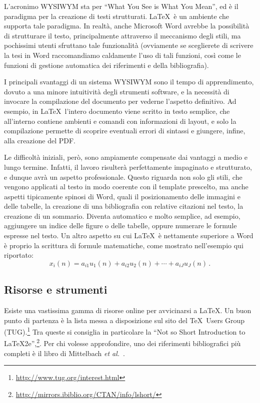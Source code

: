 \documentclass[12pt]{report}
\begin{document}
L'acronimo WYSIWYM sta per ``What You See is What You Mean'', ed è il paradigma per la creazione di testi strutturati. \LaTeX\ è un ambiente che supporta tale paradigma. In realtà, anche Microsoft Word avrebbe la possibilità di strutturare il testo, principalmente attraverso il meccanismo degli stili, ma pochissimi utenti sfruttano tale funzionalità (ovviamente se sceglierete di scrivere la tesi in Word raccomandiamo caldamente l'uso di tali funzioni, così come le funzioni di gestione automatica dei riferimenti e della bibliografia).

I principali svantaggi di un sistema WYSIWYM sono il tempo di apprendimento, dovuto a una minore intuitività degli strumenti software, e la necessità di invocare la compilazione del documento per vederne l'aspetto definitivo. Ad esempio, in \LaTeX\ l'intero documento viene scritto in testo semplice, che all'interno contiene ambienti e comandi con informazioni di layout, e solo la compilazione permette di scoprire eventuali errori di sintassi e giungere, infine, alla creazione del PDF. 

Le difficoltà iniziali, però, sono ampiamente compensate dai vantaggi a medio e lungo termine. Infatti, il lavoro risulterà perfettamente impaginato e strutturato, e dunque avrà un aspetto professionale. Questo riguarda non solo gli stili, che vengono applicati al testo in modo coerente con il template prescelto, ma anche aspetti tipicamente spinosi di Word, quali il posizionamento delle immagini e delle tabelle, la creazione di una bibliografia con relative citazioni nel testo, la creazione di un sommario. Diventa automatico e molto semplice, ad esempio, aggiungere un indice delle figure o delle tabelle, oppure numerare le formule espresse nel testo. Un altro aspetto su cui \LaTeX\ è nettamente superiore a Word è proprio la scrittura di formule matematiche, come mostrato nell'esempio qui riportato:
\begin{equation}
x_i(n) = a_{i1}u_1(n) + a_{i2}u_2(n) + \cdots + a_{iJ}u_J(n) \, .
\label{eq:multimix}
\end{equation}

\subsection{Risorse e strumenti}

Esiste una vastissima gamma di risorse online per avvicinarsi a \LaTeX. Un buon punto di partenza \`e la lista messa a disposizione sul sito del \TeX\ Users Group (TUG).\footnote{\url{http://www.tug.org/interest.html}}
Tra queste si consiglia in particolare la ``Not so Short Introduction to LaTeX2e'',\footnote{\url{http://mirrors.ibiblio.org/CTAN/info/lshort/}}. Per chi volesse approfondire, uno dei riferimenti bibliografici pi\`u completi \`e il libro di Mittelbach {\em et al.}~\cite{mittelbach2004latex}.
\end{document}

